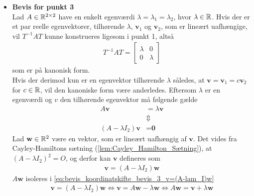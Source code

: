 \begin{bev}
    \begin{itemize}
        \item \textbf{Bevis for punkt 3}\\
        Lad $A\in \mathbb{R}^{2\times 2}$ have en enkelt egenværdi $\lambda = \lambda_1= \lambda_2$, hvor $\lambda \in \mathbb{R}$. Hvis der er et par reelle egenvektorer, tilhørende $\lambda$, $\textbf{v}_1$ og $\textbf{v}_2$, som er lineært uafhængige, vil $T^{-1}AT$ kunne konstrueres ligesom i punkt 1, altså
        \begin{align}\label{eq:bevis_koordinatskifte_k=0}
            T^{-1}AT = 
            \begin{bmatrix}
                \lambda & 0\\
                0       & \lambda
            \end{bmatrix}
        \end{align}
        som er på kanonisk form.\\
        Hvis der derimod kun er en egenvektor tilhørende $\lambda$ således, at $\textbf{v} = \textbf{v}_1 = c\textbf{v}_2$ for $c\in \mathbb{R}$, vil den kanoniske form være anderledes. 
        Eftersom $\lambda$ er en egenværdi og $v$ den tilhørende egenvektor må følgende gælde
        \begin{align*}
            A\textbf{v}               &= \lambda \textbf{v}\\
                                      &\Updownarrow\\
            (A-\lambda I_2)\textbf{v} &= \textbf{0}
        \end{align*}
        Lad $\textbf{w}\in \mathbb{R}^2$ være en vektor, som er lineært uafhængig af $\textbf{v}$.
        Det vides fra Cayley-Hamiltons sætning (\autoref{lem:Cayley_Hamilton_Sætning}), at $(A-\lambda I_2)^2=O$, og derfor kan $\textbf{v}$ defineres som
        \begin{align}\label{eq:bevis_koordinatskifte_bevis_3_v=(A-lam_I)w}
            \textbf{v} = (A-\lambda I_2)\textbf{w}
        \end{align}
        $A\textbf{w}$ isoleres i \eqref{eq:bevis_koordinatskifte_bevis_3_v=(A-lam_I)w}
        \begin{align*}
            \textbf{v}  = (A-\lambda I_2)\textbf{w}
                        \Leftrightarrow
            \textbf{v}  = A\textbf{w}-\lambda\textbf{w}
                        \Leftrightarrow
            A\textbf{w} = \textbf{v} + \lambda \textbf{w}
        \end{align*}

\end{itemize}
\end{bev}
